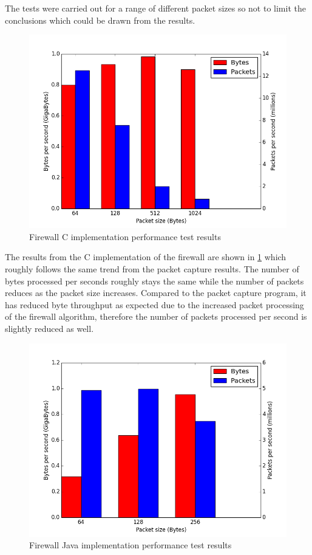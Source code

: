 \documentclass[final_report.tex]{subfiles}
\begin{document}
The tests were carried out for a range of different packet sizes so not to limit the conclusions which could be drawn from the results.

\begin{figure}[H]
	\centering
	\includegraphics[width=\textwidth]{../../data/firewall/c.png}
	\caption{Firewall C implementation performance test results}
	\label{fig:firec}
\end{figure}

The results from the C implementation of the firewall are shown in \ref{fig:firec} which roughly follows the same trend from the packet capture results. The number of bytes processed per seconds roughly stays the same while the number of packets reduces as the packet size increases. Compared to the packet capture program, it has reduced byte throughput as expected due to the increased packet processing of the firewall algorithm, therefore the number of packets processed per second is slightly reduced as well.

\begin{figure}[H]
	\centering
	\includegraphics[width=\textwidth]{../../data/firewall/java.png}
	\caption{Firewall Java implementation performance test results}
	\label{fig:firejava}
\end{figure}
\end{document}
